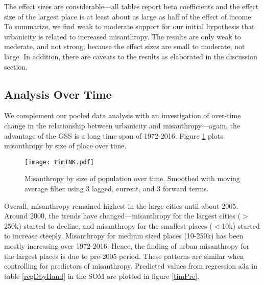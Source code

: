\documentclass[11pt, letterpaper]{article}
\begin{document}
\begin{spacing}{1.4}


The effect sizes are considerable---all tables report beta coefficients
and the effect size of the largest place is at least about as large as half of the effect
of income.  To summarize, we find weak to moderate support for our initial
hypothesis that urbanicity is related to increased misanthropy. The results are
only weak to mederate, and not strong, because the effect sizes are small to
moderate, not large. In addition, there are caveats to the results as elaborated in the discussion section.



\newpage
\subsection*{Analysis Over Time}

We complement our pooled data analysis with an investigation of over-time change
in the relationship between urbanicity and misanthropy---again, the advantage of the GSS
is a long time span of 1972-2016. Figure \ref{tim} plots misanthropy by size of
place over time.

\begin{figure}[H]
  \texttt{[image: timINK.pdf]}\centering
\caption{Misanthropy by size of population over time. Smoothed with moving average filter using 3 lagged, current, and 3 forward terms.}\label{tim}%
\end{figure}


Overall, misanthropy remained highest in the large cities until
about 2005. Around 2000, the trends have changed---misanthropy for the largest
cities ($>$250k) started to decline, and misanthropy for the smallest places
($<$10k) started to increase steeply. Misanthropy for medium
sized places (10-250k) has been mostly increasing  over 1972-2016. Hence, the
finding of urban misanthropy for the largest places is due to pre-2005 period.
%
These patterns are similar when controlling for predictors of
misanthropy. Predicted values from regression a3a in table \ref{regDbyHand} in
the SOM are plotted in figure \ref{timPre}. 



\end{spacing}
\end{document}
